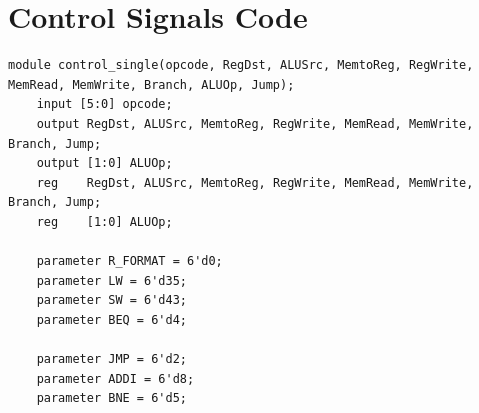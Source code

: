 \documentclass[12pt]{article}
\begin{document}
\section{Control Signals Code}
{\tiny
\begin{verbatim}
module control_single(opcode, RegDst, ALUSrc, MemtoReg, RegWrite, MemRead, MemWrite, Branch, ALUOp, Jump);
    input [5:0] opcode;
    output RegDst, ALUSrc, MemtoReg, RegWrite, MemRead, MemWrite, Branch, Jump;
    output [1:0] ALUOp;
    reg    RegDst, ALUSrc, MemtoReg, RegWrite, MemRead, MemWrite, Branch, Jump;
    reg    [1:0] ALUOp;

    parameter R_FORMAT = 6'd0;
    parameter LW = 6'd35;
    parameter SW = 6'd43;
    parameter BEQ = 6'd4;

    parameter JMP = 6'd2;
    parameter ADDI = 6'd8;
    parameter BNE = 6'd5;


\end{verbatim}}
\end{document}
